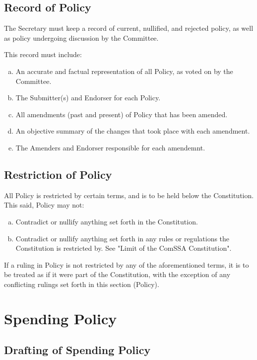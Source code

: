 \documentclass[a4paper,12pt]{article}
\begin{document}
\subsection{Record of Policy}
The Secretary must keep a record of current, nullified, and rejected policy, as well as policy undergoing discussion by the Committee.

This record must include:
\begin{enumerate}[a)]
    \item An accurate and factual representation of all Policy, as voted on by the Committee.
    \item The Submitter(s) and Endorser for each Policy.
    \item All amendments (past and present) of Policy that has been amended.
    \item An objective summary of the changes that took place with each amendment.
    \item The Amenders and Endorser responsible for each amendemnt.
\end{enumerate}

\subsection{Restriction of Policy}

All Policy is restricted by certain terms, and is to be held below the Constitution. This said, Policy may not:

\begin{enumerate}[a)]
    \item Contradict or nullify anything set forth in the Constitution.
    \item Contradict or nullify anything set forth in any rules or regulations the Constitution is restricted by. See "Limit of the ComSSA Constitution".
\end{enumerate}

If a ruling in Policy is not restricted by any of the aforementioned terms, it is to be treated as if it were part of the Constitution, with the exception of any conflicting rulings set forth in this section (Policy).

\section{Spending Policy}

\subsection{Drafting of Spending Policy}
\end{document}
